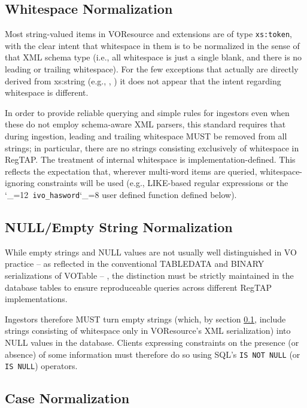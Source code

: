 \documentclass[11pt,a4paper]{ivoa}
\makeatletter
\def\rtent#1{\texttt{\color{rtcolor}\verb|#1|}}
\def\makeunderscoreletter{\catcode`\_=12}
\def\makeunderscoresubscript{\catcode`\_=8}
\def\rtent{\makeunderscoreletter\relax\rt@nt}
\def\rt@nt#1{\texttt{\color{rtcolor} #1}\makeunderscoresubscript{}}
\makeatother
\begin{document}
\subsection{Whitespace Normalization}

\label{whitenorm}

Most string-valued items in VOResource and extensions are of type
\texttt{xs:to\-ken}, with the clear intent that whitespace in them is
to be normalized in the sense of that XML schema type (i.e., all
whitespace is just a single blank, and there is no leading or trailing
whitespace).  For the few exceptions
that actually are directly derived from xs:string (e.g.,
, ) it does not
appear that the intent regarding whitespace is different.

In order to provide reliable querying and simple rules for ingestors
even when these do not employ schema-aware XML parsers, this standard
requires that during ingestion, leading and trailing whitespace MUST be
removed from all strings; in particular, there are no strings consisting
exclusively of whitespace in RegTAP.  The treatment of internal
whitespace is implementation-defined. This reflects the expectation
that, wherever multi-word items are queried, whitespace-ignoring
constraints will be used (e.g., LIKE-based regular expressions or the
\rtent{ivo_hasword} user defined function defined below).


\subsection{NULL/Empty String Normalization}

\label{nullnorm}

While empty strings and NULL values are not usually well
distinguished in VO practice -- as reflected in the conventional
TABLEDATA and BINARY serializations of VOTable -- , the distinction
must be strictly maintained in the database tables to ensure
reproduceable queries across different RegTAP implementations.

Ingestors therefore MUST turn empty strings (which, by section \ref{whitenorm}, include strings consisting of whitespace
only in VOResource's XML serialization) into NULL values in the
database.  Clients expressing constraints on the presence (or absence)
of some information must therefore do so using SQL's \texttt{IS NOT NULL}
(or \texttt{IS NULL}) operators.


\subsection{Case Normalization}
\end{document}
